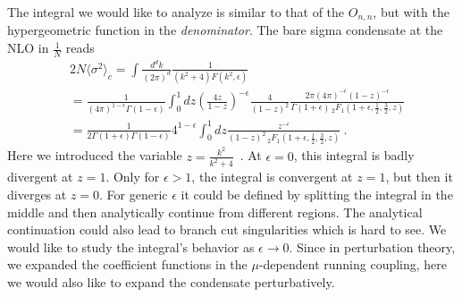 \documentclass[a4paper,11pt]{article}
\begin{document}
The integral we would like to analyze is similar to that of the $O_{n,n}$, but with the hypergeometric function in the {\it denominator}. The bare sigma condensate at the NLO in $\frac{1}{N}$ reads
\begin{align}
&2N\langle \sigma^2\rangle_c=\int\frac{d^dk}{(2\pi)^d}\frac{1}{(k^2+4)F(k^2,\epsilon)} \\ 
&=\frac{1}{(4\pi)^{1-\epsilon}\Gamma(1-\epsilon)}\int_0^1 dz\left(\frac{4z}{1-z}\right)^{-\epsilon}\frac{4}{(1-z)^2}\frac{2\pi(4\pi)^{-\epsilon}(1-z)^{-\epsilon}}{\Gamma(1+\epsilon)\,_2F_1\left(1+\epsilon,\frac{1}{2},\frac{3}{2},z\right)} \nonumber \\ 
&=\frac{1}{2\Gamma(1+\epsilon)\Gamma(1-\epsilon)}4^{1-\epsilon}\int_0^1 dz\frac{z^{-\epsilon}}{(1-z)^2\,_2F_1\left(1+\epsilon,\frac{1}{2},\frac{3}{2},z\right)} \ .
\end{align}
Here we introduced the variable $z=\frac{k^2}{k^2+4}$~\cite{Marino:2021six}. At $\epsilon=0$, this integral is badly divergent at $z=1$. Only for $\epsilon>1$, the integral is convergent at $z=1$, but then it diverges at $z=0$. For generic $\epsilon$ it could be defined by splitting the integral in the middle and then analytically continue from different regions. The analytical continuation could also lead to branch cut singularities which is hard to see. 
We would like to study the integral's behavior as $\epsilon \rightarrow 0$. Since in perturbation theory, we expanded the coefficient functions in the $\mu$-dependent running coupling, here we would also like to expand the condensate perturbatively. 
\end{document}
